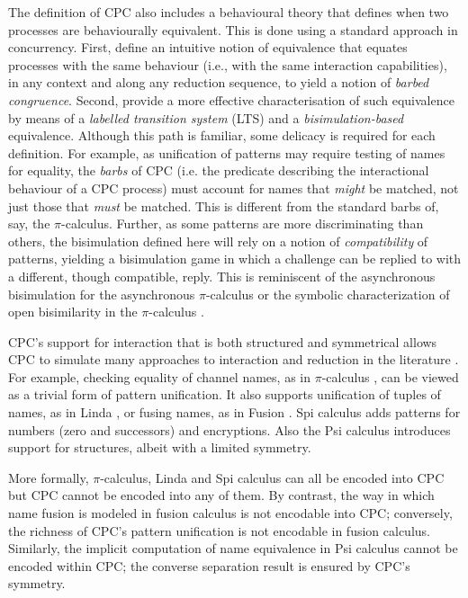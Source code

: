 \documentclass{LMCS}
\begin{document}
The definition of CPC also includes a behavioural theory that defines
when two processes are behaviourally equivalent. This is done using a
standard approach in concurrency.  First, define an intuitive notion of
equivalence that equates processes with the same behaviour (i.e., with
the same interaction capabilities), in any context and along any reduction sequence, to yield a
notion of {\em barbed congruence}. Second, provide a more effective
characterisation of such equivalence by means of a {\em labelled
transition system} (LTS) and a {\em bisimulation-based} equivalence.
Although this path is familiar, some delicacy is required for each
definition.  For example, as unification of patterns may require
testing of names for equality, the {\em barbs} of CPC (i.e.  the
predicate describing the interactional behaviour of a CPC process)
must account for names that {\em might} be matched, not just those
that {\em must} be matched.  This is different from the standard barbs
of, say, the $\pi$-calculus.  Further, as some patterns are more
discriminating than others, the bisimulation defined here will rely on
a notion of {\em compatibility} of patterns, yielding a bisimulation
game in which a challenge can be replied to with a different, though
compatible, reply. This is reminiscent of the asynchronous
bisimulation for the asynchronous $\pi$-calculus
\cite{amadio.castellani.ea:bisimulations-asynchronous}
or the symbolic characterization of open bisimilarity in the $\pi$-calculus
\cite{San96}.

CPC's support for interaction that is both structured and symmetrical
allows CPC to simulate many approaches to interaction and reduction in the
literature \cite{G:IC08}.  For example, checking equality of channel names, as in
$\pi$-calculus \cite{milner.parrow.ea:calculus-mobile}, can be viewed
as a trivial form of pattern unification. It also supports 
unification of tuples of names, as in Linda \cite{Gel85}, or fusing names,
as in Fusion \cite{parrow.victor:fusion-calculus}.  Spi calculus
\cite{gordon1997ccp} adds patterns for numbers (zero and successors)
and encryptions. Also the Psi calculus \cite{BJPV11} introduces
support for structures, albeit with a limited symmetry.

More formally, $\pi$-calculus, Linda and Spi calculus can all be
encoded into CPC but CPC cannot be encoded into any of them.  By
contrast, the way in which name fusion is modeled in fusion calculus
is not encodable into CPC; conversely, the richness of CPC's pattern
unification is not encodable in fusion calculus. Similarly, the
implicit computation of name equivalence
in Psi calculus cannot be encoded within CPC;
the converse separation result is ensured by CPC's symmetry.
\end{document}
